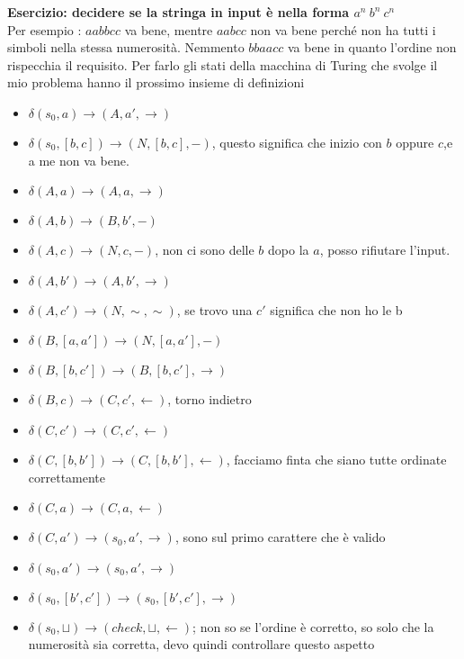 \textbf{\Large Esercizio: decidere se la stringa in input è nella forma $a^n \ b^n \ c^n$}\\
Per esempio : $aabbcc$ va bene, mentre $aabcc$ non va bene perché non ha tutti i simboli nella stessa numerosità. Nemmento $bbaacc$ va bene in quanto l'ordine non rispecchia il requisito. Per farlo gli stati della macchina di Turing che svolge il mio problema hanno il prossimo insieme di definizioni\\
\begin{itemize}
    \item $\delta(s_0, a)\to(A, a', \rightarrow)$
    \item $\delta(s_0, [b,c])\to(N,[b,c], - )$, questo significa che inizio con $b$ oppure $c$,e a me non va bene.
    \item $\delta(A, a)\to(A,a, \rightarrow)$
    \item $\delta(A, b)\to(B,b', - )$
    \item $\delta(A, c)\to(N,c , - )$, non ci sono delle $b$ dopo la $a$, posso rifiutare l'input.
    \item $\delta(A, b')\to(A, b', \rightarrow )$
    \item $\delta(A, c')\to(N, \sim , \sim )$, se trovo una $c'$ significa che non ho le b
    \item $\delta(B, [a,a'])\to(N,[a, a'] , - )$
    \item $\delta(B, [b,c'])\to(B,[b, c'], \rightarrow )$
    \item $\delta(B, c)\to(C, c', \leftarrow )$, torno indietro
    \item $\delta(C, c')\to(C, c', \leftarrow )$
    \item $\delta(C, [b,b'])\to(C, [b, b'], \leftarrow )$, facciamo finta che siano tutte ordinate correttamente
    \item $\delta(C, a)\to(C, a, \leftarrow )$
    \item $\delta(C, a')\to(s_0, a', \rightarrow )$, sono sul primo carattere che è valido
    \item $\delta(s_0, a')\to(s_0, a', \rightarrow)$
    \item $\delta(s_0, [b',c'])\to(s_0, [b',c'], \rightarrow)$
    \item $\delta(s_0,\sqcup)\to(check, \sqcup, \leftarrow)$; non so se l'ordine è corretto, so solo che la numerosità sia corretta, devo quindi controllare questo aspetto
\end{itemize}

